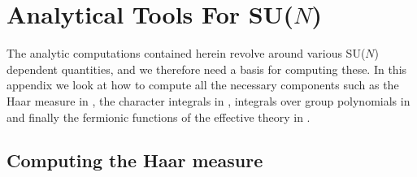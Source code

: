 \chapter{Analytical Tools For SU(\texorpdfstring{$N$}{N})} \label{apxA}

The analytic computations contained herein revolve around various SU($N$)
dependent quantities, and we therefore need a basis for computing these. In this
appendix we look at how to compute all the necessary components such as the Haar
measure in , the character integrals in
, integrals over group polynomials in
 and finally the fermionic functions of the effective
theory in
.

\section{Computing the Haar measure} \label{sec:haar_measure}

